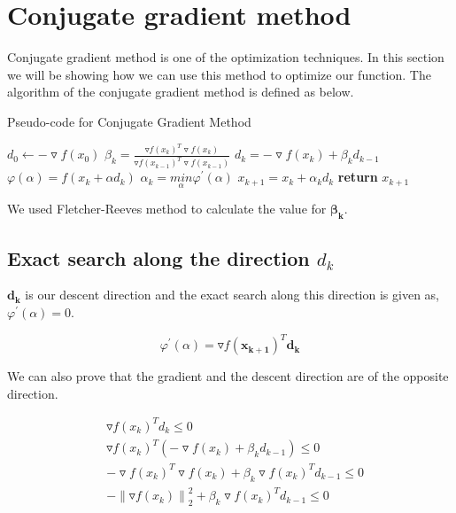 \documentclass{article}
\numberwithin{equation}{section}
\begin{document}
\section{Conjugate gradient method}

Conjugate gradient method is one of the optimization techniques. In this section we will be showing how we can use this method to optimize our function. The algorithm of the conjugate gradient method is defined as below.

\begin{algorithm}
\caption{Pseudo-code for Conjugate Gradient Method}\label{alg:cgm}
\begin{algorithmic}[1]
\State \begin{math} d_0\gets -\triangledown f(x_0) \end{math}
\State$\beta _k = \frac{\triangledown f(x_k)^{T}\triangledown f(x_k)}{\triangledown f(x_{k-1})^{T}\triangledown f(x_{k-1})} $
\State $ d_k = - \triangledown f(x_k) + \beta _k d_{k-1} $
\State $ \varphi(\alpha) = f(x_k + \alpha d_k)$
\State $ \alpha _k = \underset{\alpha}{min} \varphi ^{'} (\alpha) $
\State $ x_{k+1} =  x_k + \alpha _k d_k$
\EndWhile\label{cgmendwhile}
\State \textbf{return} $x_{k+1}$
\EndProcedure
\end{algorithmic}
\end{algorithm}

We used Fletcher-Reeves method to calculate the value for $\boldsymbol{\beta _k}$.

\subsection{Exact search along the direction $d_k$}
$\boldsymbol{d_k}$ is our descent direction and the exact search along this direction is given as, $\varphi^{'}(\alpha) = 0 $.

 \begin{equation*}
   \varphi^{'}(\alpha) = \triangledown f(\boldsymbol{x_{k+1}})^{T}\boldsymbol{d_k}
\end{equation*}

We can also prove that the gradient and the descent direction are of the opposite direction.

\begin{equation*}
\begin{aligned}
    & \triangledown f(x_k)^{T}{d_k} \leq 0 \\
    & \triangledown f(x_k)^{T} (- \triangledown f(x_k) + \beta _k d_{k-1}) \leq 0 \\
    & - \triangledown f(x_k)^T\triangledown f(x_k) + \beta _k \triangledown f(x_k)^{T}d_{k-1} \leq 0 \\
    & - \left \| \triangledown f(x_k) \right \|_2^2 + \beta _k \triangledown f(x_k)^{T}d_{k-1} \leq 0 
\end{aligned}
\end{equation*}
\end{document}
